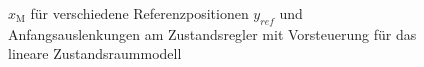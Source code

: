 \begin{figure}[H]
    \centering
    \caption[$x_{\mathrm{M}}$ für Regler mit Vorsteuerung (linear)]{$x_{\mathrm{M}}$ für verschiedene Referenzpositionen $y_{ref}$ und Anfangsauslenkungen am Zustandsregler mit Vorsteuerung für das lineare Zustandsraummodell}
    \label{fig:Bild19}
\end{figure}

